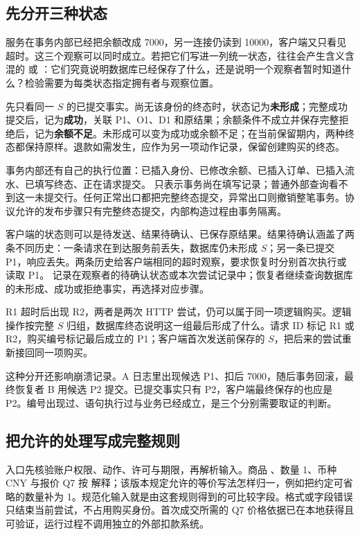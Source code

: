 \subsection*{先分开三种状态}

服务在事务内部已经把余额改成 7000，另一连接仍读到 10000，客户端又只看见超时。这三个观察可以同时成立。若把它们写进一列统一状态，往往会产生含义含混的  或 ：它们究竟说明数据库已经保存了什么，还是说明一个观察者暂时知道什么？检验需要为每类状态指定拥有者与观察位置。

先只看同一 \(S\) 的已提交事实。尚无该身份的终态时，状态记为\textbf{未形成}；完整成功提交后，记为\textbf{成功}，关联 P1、O1、D1 和原结果；余额条件不成立并保存完整拒绝后，记为\textbf{余额不足}。未形成可以变为成功或余额不足；在当前保留期内，两种终态都保持原样。退款如需发生，应作为另一项动作记录，保留创建购买的终态。

事务内部还有自己的执行位置：已插入身份、已修改余额、已插入订单、已插入流水、已填写终态、正在请求提交。 只表示事务尚在填写记录；普通外部查询看不到这一未提交行。任何正常出口都把完整终态提交，异常出口则撤销整笔事务。协议允许的发布步骤只有完整终态提交，内部构造过程由事务隔离。

客户端的状态则可以是待发送、结果待确认、已保存原结果。结果待确认涵盖了两条不同历史：一条请求在到达服务前丢失，数据库仍未形成 \(S\)；另一条已提交 P1，响应丢失。两条历史给客户端相同的超时观察，要求恢复时分别首次执行或读取 P1。 记录在观察者的待确认状态或本次尝试记录中；恢复者继续查询数据库的未形成、成功或拒绝事实，再选择对应步骤。



R1 超时后出现 R2，两者是两次 HTTP 尝试，仍可以属于同一项逻辑购买。逻辑操作按完整 \(S\) 归组，数据库终态说明这一组最后形成了什么。请求 ID 标记 R1 或 R2，购买编号标记最后成立的 P1；客户端首次发送前保存的 \(S\)，把后来的尝试重新接回同一项购买。

这种分开还影响崩溃记录。A 日志里出现候选 P1、扣后 7000，随后事务回滚，最终恢复者 B 用候选 P2 提交。已提交事实只有 P2，客户端最终保存的也应是 P2。编号出现过、语句执行过与业务已经成立，是三个分别需要取证的判断。

\subsection*{把允许的处理写成完整规则}

入口先核验账户权限、动作、许可与期限，再解析输入。商品 、数量 1、币种 CNY 与报价 Q7 按  解释；该版本规定允许的等价写法怎样归一，例如把约定可省略的数量补为 1。规范化输入就是由这套规则得到的可比较字段。格式或字段错误只结束当前尝试，不占用购买身份。首次成交所需的 Q7 价格依据已在本地获得且可验证，运行过程不调用独立的外部扣款系统。


